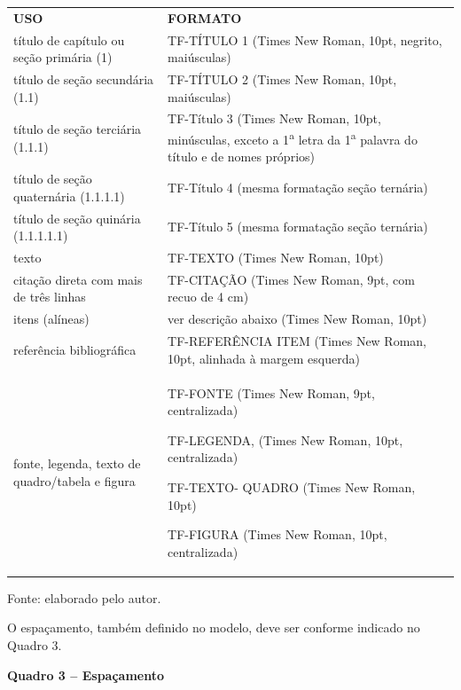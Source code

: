 \begin{longtable}[]{@{}
  >{\raggedright\arraybackslash}p{}
  >{\raggedright\arraybackslash}p{}@{}}
\toprule\noalign{}
\endhead
\bottomrule\noalign{}
\endlastfoot
\textbf{USO} & \textbf{FORMATO} \\
título de capítulo ou seção primária (1) & TF-TÍTULO 1 (Times New Roman,
10pt, negrito, maiúsculas) \\
título de seção secundária (1.1) & TF-TÍTULO 2 (Times New Roman, 10pt,
maiúsculas) \\
título de seção terciária (1.1.1) & TF-Título 3 (Times New Roman, 10pt,
minúsculas, exceto a 1\textsuperscript{a} letra da 1\textsuperscript{a}
palavra do título e de nomes próprios) \\
título de seção quaternária (1.1.1.1) & TF-Título 4 (mesma formatação
seção ternária) \\
título de seção quinária (1.1.1.1.1) & TF-Título 5 (mesma formatação
seção ternária) \\
texto & TF-TEXTO (Times New Roman, 10pt) \\
citação direta com mais de três linhas & TF-CITAÇÃO (Times New Roman,
9pt, com recuo de 4 cm) \\
itens (alíneas) & ver descrição abaixo (Times New Roman, 10pt) \\
referência bibliográfica & TF-REFERÊNCIA ITEM (Times New Roman, 10pt,
alinhada à margem esquerda) \\
fonte, legenda, texto de quadro/tabela e figura & TF-FONTE (Times New
Roman, 9pt, centralizada)

TF-LEGENDA, (Times New Roman, 10pt, centralizada)

TF-TEXTO- QUADRO (Times New Roman, 10pt)

TF-FIGURA (Times New Roman, 10pt, centralizada) \\
\end{longtable}

Fonte: elaborado pelo autor.

O espaçamento, também definido no modelo, deve ser conforme indicado no
Quadro 3.

\begin{center}\textbf{Quadro 3 -- Espaçamento}\end{center}

